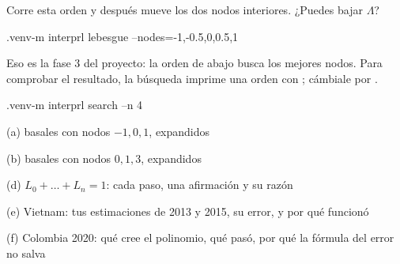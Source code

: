 \begin{nota}
Corre esta orden y después mueve los dos nodos interiores. ¿Puedes bajar $\Lambda$?
\begin{orden}
.venv\Scripts\python -m interprl lebesgue --nodes=-1,-0.5,0,0.5,1
\end{orden}
Eso es la fase 3 del proyecto: la orden de abajo busca los mejores nodos. Para comprobar el resultado, la búsqueda imprime una orden con ; cámbiale  por .
\begin{orden}
.venv\Scripts\python -m interprl search --n 4
\end{orden}
\end{nota}

\clearpage
{}

\begin{respuesta}[3.0cm]{(a) basales con nodos $-1, 0, 1$, expandidos}\end{respuesta}
\begin{respuesta}[3.0cm]{(b) basales con nodos $0, 1, 3$, expandidos}\end{respuesta}
\begin{respuesta}[6.2cm]{(d) $L_0+\dots+L_n=1$: cada paso, una afirmación y su razón}\end{respuesta}
\begin{respuesta}[1.9cm]{(e) Vietnam: tus estimaciones de 2013 y 2015, su error, y por qué funcionó}\end{respuesta}
\begin{respuesta}[2.4cm]{(f) Colombia 2020: qué cree el polinomio, qué pasó, por qué la fórmula del error no salva}\end{respuesta}


